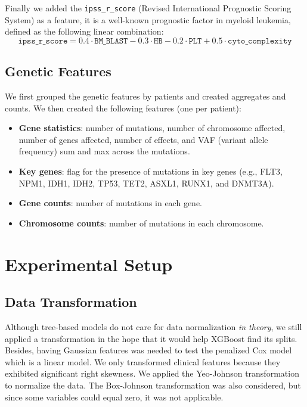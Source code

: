 \documentclass{article}
\begin{document}
Finally we added the \texttt{ipss\_r\_score} (Revised International Prognostic Scoring System) as a feature, it is a well-known prognostic factor in myeloid leukemia, defined as the following linear combination:
\begin{equation}
    \texttt{ipss\_r\_score} = 0.4 \cdot \texttt{BM\_BLAST} - 0.3 \cdot \texttt{HB} - 0.2 \cdot \texttt{PLT} + 0.5 \cdot \texttt{cyto\_complexity}
\end{equation}

\subsection{Genetic Features}
We first grouped the genetic features by patients and created aggregates and counts. We then created the following features (one per patient):
\begin{itemize}
    \item \textbf{Gene statistics}: number of mutations, number of chromosome affected, number of genes affected, number of effects, and VAF (variant allele frequency) sum and max across the mutations.
    \item \textbf{Key genes}: flag for the presence of mutations in key genes (e.g., FLT3, NPM1, IDH1, IDH2, TP53, TET2, ASXL1, RUNX1, and DNMT3A).
    \item \textbf{Gene counts}: number of mutations in each gene.
    \item \textbf{Chromosome counts}: number of mutations in each chromosome.
\end{itemize}

\section{Experimental Setup}
\subsection{Data Transformation}
Although tree-based models do not care for data normalization \textit{in theory}, we still applied a transformation in the hope that it would help XGBoost find its splits. Besides, having Gaussian features was needed to test the penalized Cox model which is a linear model. We only transformed clinical features because they exhibited significant right skewness. We applied the Yeo-Johnson transformation to normalize the data. The Box-Johnson transformation was also considered, but since some variables could equal zero, it was not applicable.
\end{document}
